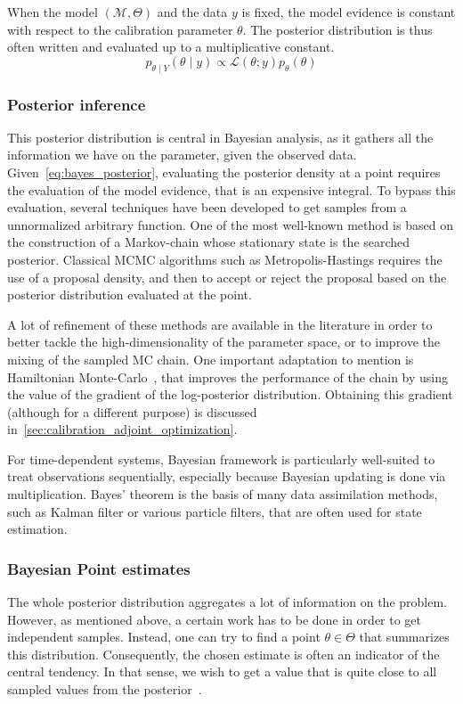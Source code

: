\documentclass[../../Main_ManuscritThese.tex]{subfiles}
\begin{document}
When the model $(\mathcal{M},\Theta)$ and the data $y$ is fixed, the model evidence is constant with respect to the calibration parameter $\theta$. The posterior distribution is thus often written and evaluated up to a multiplicative constant.
\begin{equation}
p_{\theta \mid Y}(\theta \mid y) \propto \mathcal{L}(\theta;y)p_{\theta}(\theta)
\end{equation}



\subsubsection{Posterior inference}
\label{sec:posterior_inference}
This posterior distribution is central in Bayesian analysis, as it gathers all the information we have on the parameter, given the observed data. Given~\cref{eq:bayes_posterior}, evaluating the posterior density at a point requires the evaluation of the model evidence, that is an expensive integral. To bypass this evaluation, several techniques have been developed to get samples from a unnormalized arbitrary function. One of the most well-known method is based on the construction of a Markov-chain whose stationary state is the searched posterior. Classical MCMC algorithms such as Metropolis-Hastings requires the use of a proposal density, and then to accept or reject the proposal based on the posterior distribution evaluated at the point.

A lot of refinement of these methods are available in the literature in order to better tackle the high-dimensionality of the parameter space, or to improve the mixing of the sampled MC chain. One important adaptation to mention is Hamiltonian Monte-Carlo~\cite{hanson_markov_2001,betancourt_conceptual_2017}, that improves the performance of the chain by using the value of the gradient of the log-posterior distribution. Obtaining this gradient (although for a different purpose) is discussed in~\cref{sec:calibration_adjoint_optimization}.


For time-dependent systems, Bayesian framework is particularly well-suited to treat observations sequentially, especially because Bayesian updating is done via multiplication. Bayes' theorem is the basis of many data assimilation methods, such as Kalman filter or various particle filters, that are often used for state estimation.

\subsubsection{Bayesian Point estimates}
\label{sec:bayes_point_estimates}
The whole posterior distribution aggregates a lot of information on the problem. However, as mentioned above, a certain work has to be done in order to get independent samples. Instead, one can try to find a point $\theta \in \Theta$ that summarizes %
this distribution. Consequently, the chosen estimate is often an indicator of the central tendency. In that sense, we wish to get a value that is quite close to all sampled values from the posterior~\cite{lehmann_theory_2006}.
\end{document}
